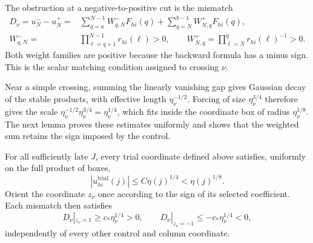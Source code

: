 The obstruction at a negative-to-positive cut is the mismatch
\begin{equation}
 \begin{split}
 D_\nu=u_N^--u_N^+
  ={}&\sum_{q=a}^{N-1}W^-_{q,N}F_{hi}(q)
       +\sum_{q=N}^{b-1}W^+_{N,q}F_{hi}(q),\\
 W^-_{q,N}={}&\prod_{\ell=q+1}^{N-1}r_{hi}(\ell)>0,\qquad
 W^+_{N,q}=\prod_{\ell=N}^{q}r_{hi}(\ell)^{-1}>0.
 \end{split}
 \label{n:eq-matching-mismatch}
\end{equation}
Both weight families are positive because the backward formula has a minus
sign.  This is the scalar matching condition assigned to crossing \(\nu\).

Near a simple crossing, summing the linearly vanishing gap gives Gaussian
decay of the stable products, with effective length
\(\eta_\nu^{-1/2}\).  Forcing of size \(\eta_\nu^{3/4}\) therefore gives
the scale \(\eta_\nu^{-1/2}\eta_\nu^{3/4}=\eta_\nu^{1/4}\), which fits
inside the coordinate box of radius \(\eta_\nu^{1/8}\).  The next lemma
proves these estimates uniformly and shows that the weighted sum retains
the sign imposed by the control.

\begin{lemma}
\label{n:lem-matching-weights}
For all sufficiently late \(J\), every trial coordinate defined above
satisfies, uniformly on the full product of boxes,
\begin{equation}
 |u_{hi}^{\mathrm{trial}}(j)|\leq C\eta(j)^{1/4}
       <\eta(j)^{1/8}.
 \label{n:eq-trial-small}
\end{equation}
Orient the coordinate \(z_\nu\) once according to the sign of its selected
coefficient.  Each mismatch then satisfies
\begin{equation}
 D_\nu|_{z_\nu=1}\geq c_*\eta_\nu^{1/4}>0,\qquad
 D_\nu|_{z_\nu=-1}\leq-c_*\eta_\nu^{1/4}<0,
 \label{n:eq-mismatch-endpoint-signs}
\end{equation}
independently of every other control and column coordinate.
\end{lemma}

